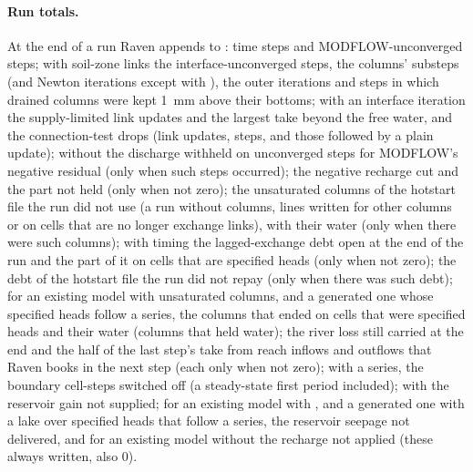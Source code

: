 \paragraph{Run totals.} At the end of a run Raven appends to : time steps and MODFLOW-unconverged steps; with
soil-zone links the interface-unconverged steps, the columns' substeps (and Newton iterations except with ), the outer
iterations and steps in which drained columns were kept 1~mm above their bottoms; with an interface iteration the
supply-limited link updates and the largest take beyond the free water, and the connection-test drops (link updates, steps,
and those followed by a plain update); without  the discharge withheld on unconverged steps for
MODFLOW's negative residual (only when such steps occurred); the negative recharge cut and the part not held (only when not zero); the
unsaturated columns of the hotstart file the run did not use (a run without columns, lines written for other columns or
on cells that are no longer exchange links), with their water (only when there were such columns); with  timing
the lagged-exchange debt open at the end of the run and the part of it on cells that are specified heads (only when not
zero); the debt of the hotstart file the run did not repay (only when there was such debt); for an existing model with unsaturated columns, and a generated one whose specified heads follow a
 series, the columns that ended on cells that were specified heads and their water (columns that held
water); the river loss still carried at the end and the half of the last step's take from reach inflows and outflows that
Raven books in the next step (each only when not zero); with a
 series, the boundary cell-steps switched off (a steady-state first period included); with
 the reservoir gain not supplied; for an existing model with , and a
generated one with a lake over specified heads that follow a  series, the reservoir seepage not
delivered, and for an existing model without  the recharge not applied (these always written, also 0).


